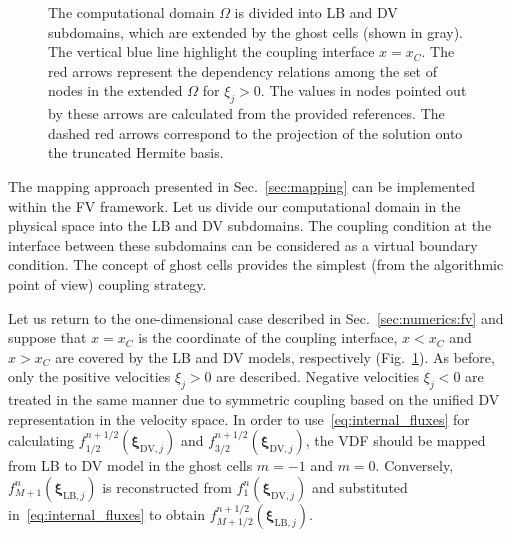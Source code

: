\documentclass{elsarticle} %
\newcommand{\bxi}{\boldsymbol{\xi}}
\newcommand{\LB}{\mathrm{LB}}
\newcommand{\DV}{\mathrm{DV}}
\begin{document}
\begin{figure}
    \caption{
        The computational domain \(\Omega\) is divided into LB and DV subdomains,
        which are extended by the ghost cells (shown in gray).
        The vertical blue line highlight the coupling interface \(x=x_C\).
        The red arrows represent the dependency relations
        among the set of nodes in the extended \(\Omega\) for \(\xi_j>0\).
        The values in nodes pointed out by these arrows are calculated from the provided references.
        The dashed red arrows correspond to the projection of the solution onto the truncated Hermite basis.
    }
    \label{fig:coupling_scheme}
\end{figure}

The mapping approach presented in Sec.~\ref{sec:mapping} can be implemented within the FV framework.
Let us divide our computational domain in the physical space into the LB and DV subdomains.
The coupling condition at the interface between these subdomains can be considered as a virtual boundary condition.
The concept of ghost cells provides the simplest (from the algorithmic point of view) coupling strategy.

Let us return to the one-dimensional case described in Sec.~\ref{sec:numerics:fv}
and suppose that \(x=x_C\) is the coordinate of the coupling interface,
\(x<x_C\) and \(x>x_C\) are covered by the LB and DV models, respectively (Fig.~\ref{fig:coupling_scheme}).
As before, only the positive velocities \(\xi_j>0\) are described.
Negative velocities \(\xi_j<0\) are treated in the same manner due to
symmetric coupling based on the unified DV representation in the velocity space.
In order to use~\eqref{eq:internal_fluxes} for calculating \(f^{n+1/2}_{1/2}(\bxi_{\DV,j})\)
and \(f^{n+1/2}_{3/2}(\bxi_{\DV,j})\),
the VDF should be mapped from LB to DV model in the ghost cells \(m=-1\) and \(m=0\).
Conversely, \(f^n_{M+1}(\bxi_{\LB,j})\) is reconstructed from \(f^n_1(\bxi_{\DV,j})\)
and substituted in~\eqref{eq:internal_fluxes} to obtain \(f^{n+1/2}_{M+1/2}(\bxi_{\LB,j})\).
\end{document}
